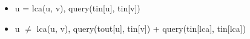 \begin{itemize}
\item u = lca(u, v), query(tin[u], tin[v])
\item u $\neq$ lca(u, v), query(tout[u], tin[v]) + query(tin[lca], tin[lca]) 
\end{itemize}

